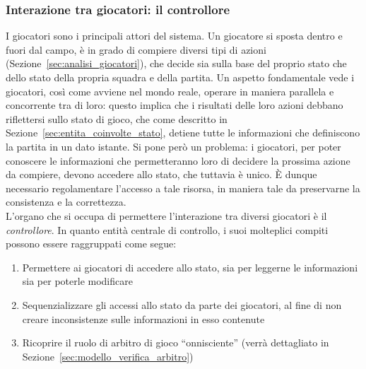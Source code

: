 
%

\subsubsection{Interazione tra giocatori: il controllore}
\label{sec:modello_interazione_giocatori}

I giocatori sono i principali attori del sistema. Un giocatore si sposta dentro e fuori dal campo, è in grado di compiere diversi tipi di azioni (Sezione~\ref{sec:analisi_giocatori}), che decide sia sulla base del proprio stato che dello stato della propria squadra e della partita. Un aspetto fondamentale vede i giocatori, così come avviene nel mondo reale, operare in maniera parallela e concorrente tra di loro: questo implica che i risultati delle loro azioni debbano riflettersi sullo stato di gioco, che come descritto in Sezione~\ref{sec:entita_coinvolte_stato}, detiene tutte le informazioni che definiscono la partita in un dato istante. Si pone però un problema: i giocatori, per poter conoscere le informazioni che permetteranno loro di decidere la prossima azione da compiere, devono accedere allo stato, che tuttavia è unico. È dunque necessario regolamentare l'accesso a tale risorsa, in maniera tale da preservarne la consistenza e la correttezza.\\

L'organo che si occupa di permettere l'interazione tra diversi giocatori è il \textit{controllore}. In quanto entità centrale di controllo, i suoi molteplici compiti possono essere raggruppati come segue:

\begin{enumerate}
	\item Permettere ai giocatori di accedere allo stato, sia per leggerne le informazioni sia per poterle modificare
	\item Sequenzializzare gli accessi allo stato da parte dei giocatori, al fine di non creare inconsistenze sulle informazioni in esso contenute
	\item Ricoprire il ruolo di arbitro di gioco ``onnisciente'' (verrà dettagliato in Sezione~\ref{sec:modello_verifica_arbitro})
\end{enumerate}

